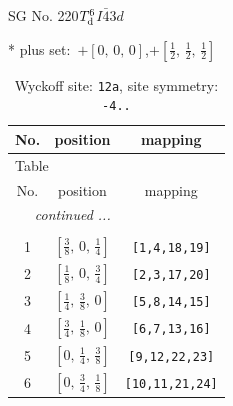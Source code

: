 \documentclass[fleqn,8pt]{jsarticle}
\begin{document}
\setcounter{MaxMatrixCols}{32}

\renewcommand{\tablename}{Table~}
\renewcommand{\figurename}{Figure~}
\begin{center}
\LARGE
SG No. 220\quad$T_{\rm d}^{6}$\quad$I\bar{4}3d$\quad[ cubic ]
\end{center}
* plus set:\,\,\,$+\left[ 0,\, 0,\, 0 \right]$,\quad $+\left[ \frac{1}{2},\, \frac{1}{2},\, \frac{1}{2} \right]$
\renewcommand{\arraystretch}{1.2}
\begin{longtable}{ccc}
\caption{Wyckoff site: {\tt 12a}, site symmetry: {\tt -4..}}
 \\
 \hline \hline
No. & position & mapping \\ \hline \endfirsthead

\multicolumn{2}{l}{\tablename\ \thetable{}} \\
 \hline \hline
No. & position & mapping \\ \hline \endhead

 \hline \hline
\multicolumn{2}{r}{\footnotesize\it continued ...} \\ \endfoot

 \hline \hline
\multicolumn{2}{r}{} \\ \endlastfoot

1 & $\left[ \frac{3}{8},\, 0,\, \frac{1}{4} \right]$ & {\tt [1,4,18,19]} \\ \hline
2 & $\left[ \frac{1}{8},\, 0,\, \frac{3}{4} \right]$ & {\tt [2,3,17,20]} \\ \hline
3 & $\left[ \frac{1}{4},\, \frac{3}{8},\, 0 \right]$ & {\tt [5,8,14,15]} \\ \hline
4 & $\left[ \frac{3}{4},\, \frac{1}{8},\, 0 \right]$ & {\tt [6,7,13,16]} \\ \hline
5 & $\left[ 0,\, \frac{1}{4},\, \frac{3}{8} \right]$ & {\tt [9,12,22,23]} \\ \hline
6 & $\left[ 0,\, \frac{3}{4},\, \frac{1}{8} \right]$ & {\tt [10,11,21,24]} \\
\end{longtable}
\renewcommand{\arraystretch}{1.2}
\end{document}

